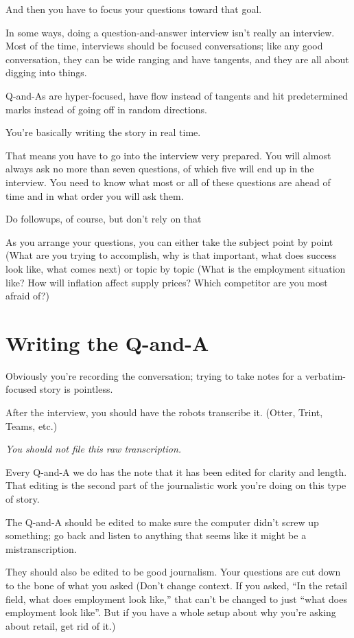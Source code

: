\documentclass[
  11pt,
  american,
  letterpaperpaper,
  extrafontsizes,onecolumn,openright
  ]{memoir}
\begin{document}
And then you have to focus your questions toward that goal.

In some ways, doing a question-and-answer interview isn't really an interview. Most of the time, interviews should be focused conversations; like any good conversation, they can be wide ranging and have tangents, and they are all about digging into things.

Q-and-As are hyper-focused, have flow instead of tangents and hit predetermined marks instead of going off in random directions.

You're basically writing the story in real time.

That means you have to go into the interview very prepared. You will almost always ask no more than seven questions, of which five will end up in the interview. You need to know what most or all of these questions are ahead of time and in what order you will ask them.

Do followups, of course, but don't rely on that

As you arrange your questions, you can either take the subject point by point (What are you trying to accomplish, why is that important, what does success look like, what comes next) or topic by topic (What is the employment situation like? How will inflation affect supply prices? Which competitor are you most afraid of?)

\hypertarget{writing-the-q-and-a}{%
\section*{Writing the Q-and-A}\label{writing-the-q-and-a}}

Obviously you're recording the conversation; trying to take notes for a verbatim-focused story is pointless.

After the interview, you should have the robots transcribe it. (Otter, Trint, Teams, etc.)

\emph{You should not file this raw transcription.}

Every Q-and-A we do has the note that it has been edited for clarity and length. That editing is the second part of the journalistic work you're doing on this type of story.

The Q-and-A should be edited to make sure the computer didn't screw up something; go back and listen to anything that seems like it might be a mistranscription.

They should also be edited to be good journalism. Your questions are cut down to the bone of what you asked (Don't change context. If you asked, \enquote{In the retail field, what does employment look like,} that can't be changed to just \enquote{what does employment look like}. But if you have a whole setup about why you're asking about retail, get rid of it.)
\end{document}
